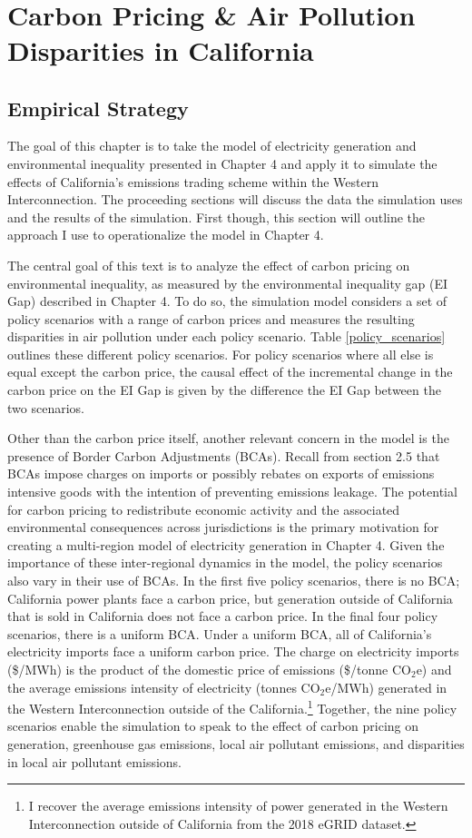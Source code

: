 ~
\newpage
\section{Carbon Pricing \& Air Pollution Disparities in California}

\subsection{Empirical Strategy}

The goal of this chapter is to take the model of electricity generation and environmental inequality presented in Chapter 4 and apply it to simulate the effects of California's emissions trading scheme within the Western Interconnection. The proceeding sections will discuss the data the simulation uses and the results of the simulation. First though, this section will outline the approach I use to operationalize the model in Chapter 4. 



The central goal of this text is to analyze the effect of carbon pricing on environmental inequality, as measured by the environmental inequality gap (EI Gap) described in Chapter 4. To do so, the simulation model considers a set of policy scenarios with a range of carbon prices and measures the resulting disparities in air pollution under each policy scenario. Table \ref{policy_scenarios} outlines these different policy scenarios. For policy scenarios where all else is equal except the carbon price, the causal effect of the incremental change in the carbon price on the EI Gap is given by the difference the EI Gap between the two scenarios. 

Other than the carbon price itself, another relevant concern in the model is the presence of Border Carbon Adjustments (BCAs). Recall from section 2.5 that BCAs impose charges on imports or possibly rebates on exports of emissions intensive goods with the intention of preventing emissions leakage. The potential for carbon pricing to redistribute economic activity and the associated environmental consequences across jurisdictions is the primary motivation for creating a multi-region model of electricity generation in Chapter 4. Given the importance of these inter-regional dynamics in the model, the policy scenarios also vary in their use of BCAs. In the first five policy scenarios, there is no BCA; California power plants face a carbon price, but generation outside of California that is sold in California does not face a carbon price. In the final four policy scenarios, there is a uniform BCA. Under a uniform BCA, all of California's electricity imports face a uniform carbon price. The charge on electricity imports (\$/MWh) is the product of the domestic price of emissions (\$/tonne CO$_2$e) and the average emissions intensity of electricity (tonnes CO$_2$e/MWh) generated in the Western Interconnection outside of the California.\footnote{I recover the average emissions intensity of power generated in the Western Interconnection outside of California from the 2018 eGRID dataset.} Together, the nine policy scenarios enable the simulation to speak to the effect of carbon pricing on generation, greenhouse gas emissions, local air pollutant emissions, and disparities in local air pollutant emissions.

